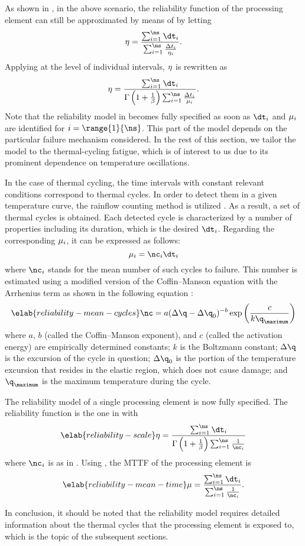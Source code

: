As shown in \cite{xiang2010}, in the above scenario, the reliability function of
the processing element can still be approximated by means of
 by letting
\[
  \scale = \frac{\sum_{i = 1}^\ns \dt_i}{\sum_{i = 1}^\ns \frac{\Delta t_i}{\scale_i}}.
\]
Applying  at the level of individual intervals,
$\eta$ is rewritten as
\[
  \scale = \frac{\sum_{i = 1}^\ns \dt_i}{\Gamma\left(1 + \frac{1}{\shape}\right) \sum_{i = 1}^\ns \frac{\Delta t_i}{\mean_i}}.
\]
Note that the reliability model in  becomes fully
specified as soon as $\dt_i$ and $\mu_i$ are identified for $i =
\range{1}{\ns}$. This part of the model depends on the particular failure
mechanism considered. In the rest of this section, we tailor the model to the
thermal-cycling fatigue, which is of interest to us due to its prominent
dependence on temperature oscillations.

In the case of thermal cycling, the time intervals with constant relevant
conditions correspond to thermal cycles. In order to detect them in a given
temperature curve, the rainflow counting method is utilized \cite{xiang2010}. As
a result, a set of \ns thermal cycles is obtained. Each detected cycle is
characterized by a number of properties including its duration, which is the
desired $\dt_i$. Regarding the corresponding $\mu_i$, it can be expressed as
follows:
\[
  \mean_i = \nc_i \dt_i
\]
where $\nc_i$ stands for the mean number of such cycles to failure. This number
is estimated using a modified version of the Coffin--Manson equation with the
Arrhenius term as shown in the following equation \cite{xiang2010, jedec2016}:
\begin{equation} \elab{reliability-mean-cycles}
  \nc = a (\Delta \q - \Delta \q_0)^{-b} \exp\left(\frac{c}{k \q_\maximum}\right)
\end{equation}
where $a$, $b$ (called the Coffin--Manson exponent), and $c$ (called the
activation energy) are empirically determined constants; $k$ is the Boltzmann
constant; $\Delta \q$ is the excursion of the cycle in question; $\Delta \q_0$
is the portion of the temperature excursion that resides in the elastic region,
which does not cause damage; and $\q_\maximum$ is the maximum temperature during
the cycle.

The reliability model of a single processing element is now fully specified. The
reliability function is the one in  with
\begin{equation} \elab{reliability-scale}
  \scale = \frac{\sum_{i = 1}^\ns \dt_i}{\Gamma\left(1 + \frac{1}{\shape}\right) \sum_{i = 1}^\ns \frac{1}{\nc_i}}
\end{equation}
where $\nc_i$ is as in . Using
, the \ac{MTTF} of the processing element is
\begin{equation} \elab{reliability-mean-time}
  \mean = \frac{\sum_{i = 1}^\ns \dt_i}{\sum_{i = 1}^\ns \frac{1}{\nc_i}}.
\end{equation}

In conclusion, it should be noted that the reliability model requires detailed
information about the thermal cycles that the processing element is exposed to,
which is the topic of the subsequent sections.
